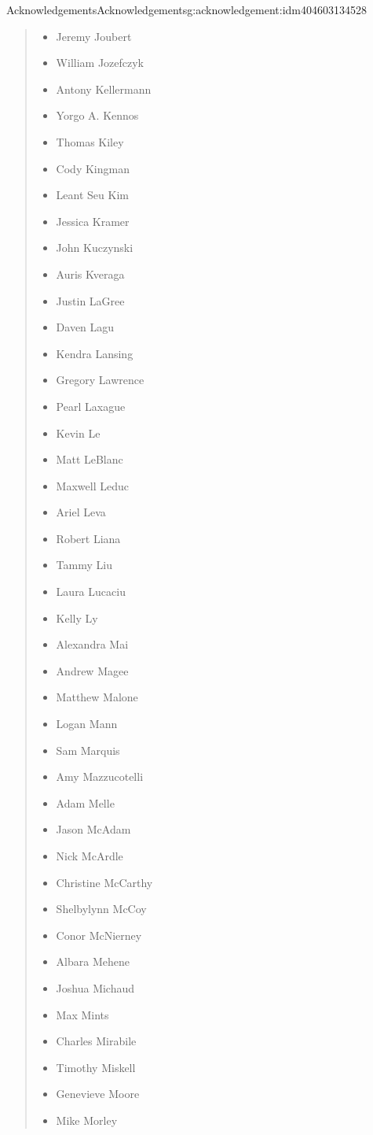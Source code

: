 \documentclass[twoside,10pt,]{book}
\numberwithin{equation}{section}
\begin{document}
\begin{acknowledgement}{Acknowledgements}{}{Acknowledgements}{}{}{g:acknowledgement:idm404603134528}
\begin{quote}
\begin{multicols}{2}
\begin{itemize}[label=\textbullet]
\item{}Jeremy Joubert%
\item{}William Jozefczyk%
\item{}Antony Kellermann%
\item{}Yorgo A. Kennos%
\item{}Thomas Kiley%
\item{}Cody Kingman%
\item{}Leant Seu Kim%
\item{}Jessica Kramer%
\item{}John Kuczynski%
\item{}Auris Kveraga%
\item{}Justin LaGree%
\item{}Daven Lagu%
\item{}Kendra Lansing%
\item{}Gregory Lawrence%
\item{}Pearl Laxague%
\item{}Kevin Le%
\item{}Matt LeBlanc%
\item{}Maxwell Leduc%
\item{}Ariel Leva%
\item{}Robert Liana%
\item{}Tammy Liu%
\item{}Laura Lucaciu%
\item{}Kelly Ly%
\item{}Alexandra Mai%
\item{}Andrew Magee%
\item{}Matthew Malone%
\item{}Logan Mann%
\item{}Sam Marquis%
\item{}Amy Mazzucotelli%
\item{}Adam Melle%
\item{}Jason McAdam%
\item{}Nick McArdle%
\item{}Christine McCarthy%
\item{}Shelbylynn McCoy%
\item{}Conor McNierney%
\item{}Albara Mehene%
\item{}Joshua Michaud%
\item{}Max Mints%
\item{}Charles Mirabile%
\item{}Timothy Miskell%
\item{}Genevieve Moore%
\item{}Mike Morley%

\end{itemize}
\end{multicols}
\end{quote}
\end{acknowledgement}
\end{document}
